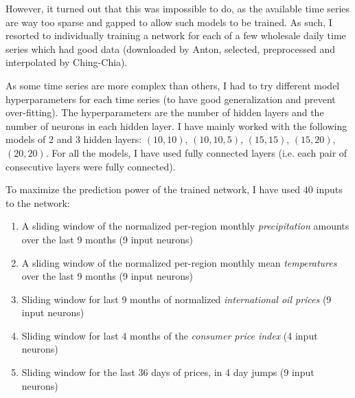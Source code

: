 However, it turned out that this was impossible to do, as the available time
series are way too sparse and gapped to allow such models to be trained.
As such, I resorted to individually training a network for each of a few
wholesale daily time series which had good data (downloaded by Anton, selected,
preprocessed and interpolated by Ching-Chia).

As some time series are more complex than others, I had to try different
model hyperparameters for each time series (to have good generalization and
prevent over-fitting). The hyperparameters are the number
of hidden layers and the number of neurons in each hidden layer. I have mainly
worked with the following models of 2 and 3 hidden layers: $(10, 10)$,
$(10, 10, 5)$, $(15, 15)$, $(15, 20)$, $(20, 20)$. For all the models, I have
used fully connected layers (i.e. each pair of consecutive layers were fully
connected).

To maximize the prediction power of the trained network, I have used $40$
inputs to the network:
\begin{enumerate}
\item A sliding window of the normalized per-region monthly \emph{precipitation} amounts over the last 9 months (9 input neurons)
\item A sliding window of the normalized per-region monthly mean \emph{temperatures} over the last 9 months (9 input neurons)
\item Sliding window for last 9 months of normalized \emph{international oil prices} (9 input neurons)
\item Sliding window for last 4 months of the \emph{consumer price index} (4 input neurons)
\item Sliding window for the last 36 days of prices, in 4 day jumps (9 input neurons)
\end{enumerate}

